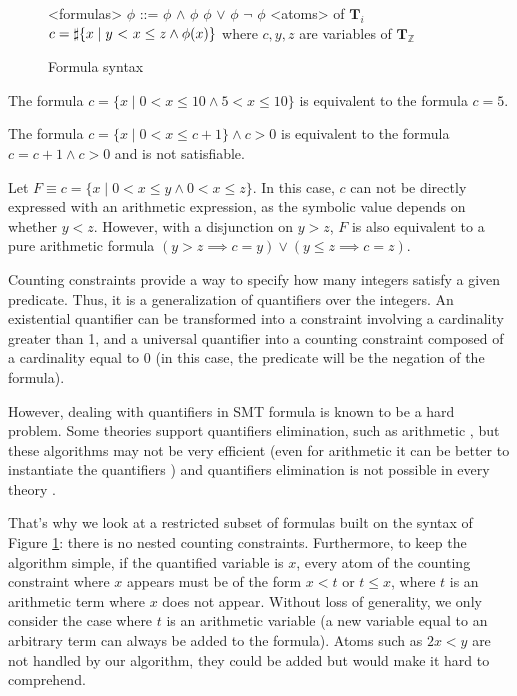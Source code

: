 \documentclass[]{article}
\begin{document}
\begin{figure}[h]
\begin{grammar}
    
<formulas> $\phi$ ::= $\phi$ $\land$ $\phi$
\alt $\phi$ $\lor$ $\phi$
\alt $\lnot$ $\phi$
\alt <atoms> of $\mathbf{T}_i$
\alt $c = \sharp\{ x \mid y\ \text{\textless}\ x \le z \land \phi(x) \}$ where $c, y, z$ are variables of $\mathbf{T}_\mathbb{Z}$

\end{grammar}

\caption{Formula syntax}
\label{formula}
\end{figure}

\begin{example}
The formula $c = \{x \mid 0 < x \le 10 \land 5 < x \le 10\}$ is equivalent to the formula $c = 5$.
\end{example}

\begin{example} The formula $c = \{x \mid 0 < x \le c + 1\} \land c > 0$ is equivalent to the formula $c = c+1 \land c >0$ and is not satisfiable.
\end{example}

\begin{example} Let  $F \equiv c = \{x \mid 0 < x \le y \land 0 < x \le z\}$. In this case, $c$ can
not be directly expressed with an arithmetic expression, as the symbolic value depends on whether $y < z$. However, with a disjunction on $y >z$, $F$ is also equivalent to a pure arithmetic formula $(y > z \implies c = y) \lor (y \le z \implies c = z)$.
\end{example}

Counting constraints provide a way to specify how many integers satisfy
a given predicate. Thus, it is a generalization of quantifiers over the
integers. An existential
quantifier can be transformed into a constraint involving a cardinality
greater than 1, and a universal quantifier into a counting constraint
composed of a cardinality equal to 0 (in this case, the predicate will
be the negation of the formula).

However, dealing with quantifiers in SMT formula is known to be a hard problem. Some theories
support quantifiers elimination, such as arithmetic \cite{cooper}, but these algorithms may not be very
efficient (even for arithmetic it can be better to instantiate the quantifiers \cite{dutertre2015solving}) and quantifiers elimination is not possible in every theory \cite{bradley2006s}.

That's why we look at a restricted subset of formulas built on the syntax of Figure \ref{formula}:
there is no nested counting constraints. Furthermore, to keep the algorithm simple, if the
quantified variable is $x$, every atom of the counting constraint where $x$ appears must be of the form $x < t$ or $t \le x$,
where $t$ is an arithmetic term where $x$ does not appear. Without loss of generality, we only
consider the case where $t$  is an arithmetic variable (a new variable equal to an arbitrary term
can always be added to the formula). Atoms such as $2x < y$ are not handled by our algorithm, 
they could be added but would make it hard to comprehend.
\end{document}
